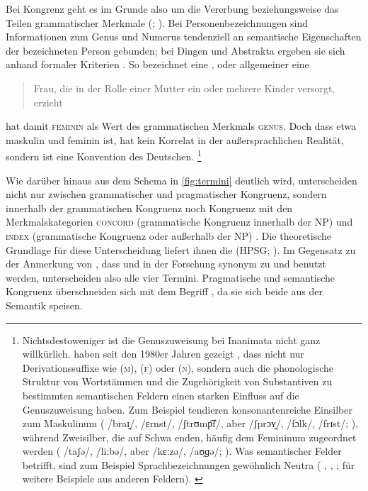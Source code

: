 Bei Kongrenz geht es im Grunde also um die Vererbung beziehungsweise das Teilen
grammatischer Merkmale (; \cite{corbett2012}). Bei
Personenbezeichnungen sind Informationen zum Genus und Numerus tendenziell an
semantische Eigenschaften der bezeichneten Person gebunden; bei Dingen und
Abstrakta ergeben sie sich anhand formaler Kriterien \autocites[vgl.][2--4,
125--132]{corbett2006}{koepckezubin2017}. So bezeichnet  eine
, oder allgemeiner
eine \blockcquote[s.\,v.~]{duden-online}{Frau, die in der Rolle
einer Mutter ein oder mehrere Kinder versorgt, erzieht}.  hat damit
\textsc{feminin} als Wert des grammatischen Merkmals \textsc{genus}. Doch dass
etwa  maskulin und  feminin ist, hat kein Korrelat in der
außersprachlichen Realität, sondern ist eine Konvention des Deutschen.%
%
	\footnote{Nichtsdestoweniger ist die Genuszuweisung bei Inanimata nicht
		ganz willkürlich. \citeauthor{koepckezubin2017} haben seit den 1980er
		Jahren gezeigt
		\autocites[z.\,B.][]%
			{koepcke1982}%
			{koepckezubin1996}%
			{koepckezubin2009}%
			{koepckezubin2017},
		dass nicht nur Derivationssuffixe wie
			 (\textsc{m}),
			 (\textsc{f}) oder
			 (\textsc{n}),
		sondern auch die phonologische Struktur von Wortstämmen und die
		Zugehörigkeit von Substantiven zu bestimmten semantischen Feldern einen
		starken Einfluss auf die Genuszuweisung haben. Zum Beispiel tendieren
		konsonantenreiche Einsilber zum Maskulinum (%
			 /braɪ̯/,
			 /ɛrnst/,
			 /ʃtrʊmp͡f/, aber
			 /ʃprɔʏ̯/,
			 /fɔlk/,
			 /frɪst/;
		\cite[vgl.][475--479]{koepckezubin1996}), während Zweisilber, die auf
		Schwa enden, häufig dem Femininum zugeordnet werden (%
			 /taʃə/,
			 /liːbə/, aber
			 /kɛːzə/,
			 /aʊ̯ɡə/;
		\cite[vgl.][207--209]{koepckezubin2017}). Was semantischer Felder
		betrifft, sind zum Beispiel Sprachbezeichnungen gewöhnlich Neutra (%
			,
			,
			;
		\cites[vgl.]%
			[480]{koepckezubin1996}%
			[137--139]{koepckezubin2009}%
			[210--214]{koepckezubin2017}
		für weitere Beispiele aus anderen Feldern).%
		\label{fn:koepckezubin}
	}

Wie darüber hinaus aus dem Schema in \cref{fig:termini} deutlich wird,
unterscheiden \citet{wechslerzlatic2003} nicht nur zwischen grammatischer und
pragmatischer Kongruenz, sondern innerhalb der grammatischen Kongruenz noch
Kongruenz mit den Merkmalskategorien \textsc{concord} (grammatische Kongruenz
 innerhalb der NP) und \textsc{index} (grammatische Kongruenz
 oder  außerhalb der NP)
\citep[8--17]{wechslerzlatic2003}. Die theoretische Grundlage für diese
Unterscheidung liefert ihnen die 
(HPSG; \cite{pollardsag1994}). Im Gegensatz zu der Anmerkung von
\citet[164]{fleischer2012}, dass  und  in der
Forschung synonym zu  und  benutzt werden,
unterscheiden \citet{wechslerzlatic2003} also alle vier Termini. Pragmatische
und semantische Kongruenz überschneiden sich mit dem Begriff , da sie sich beide aus der Semantik speisen.


